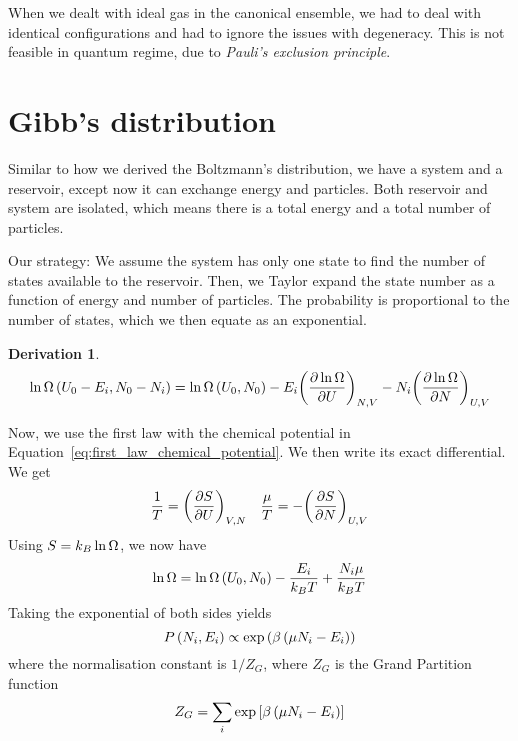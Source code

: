 \documentclass[12pt,chapterprefix=false,dvipsnames]{scrbook}
\theoremstyle{dotless}
\theoremstyle{definition}
\newtheorem{protoderivation}{Derivation}[section]
\newenvironment{derivation}
{\colorlet{shadecolor}{purple!15}\begin{shaded}\begin{protoderivation}}
			{\end{protoderivation}\end{shaded}}
\begin{document}
When we dealt with ideal gas in the canonical ensemble, we had
to deal with identical configurations and had to ignore the
issues with degeneracy. This is not feasible in quantum regime,
due to \textit{Pauli's exclusion principle}.

\section{Gibb's distribution}%
\label{sec:gibb_s_distribution}

Similar to how we derived the Boltzmann's distribution, we have
a system and a reservoir, except now it can exchange energy and
particles. Both reservoir and system are isolated, which means
there is a total energy and a total number of particles.

Our strategy: We assume the system has only one state to find
the number of states available to the reservoir. Then, we Taylor
expand the state number as a function of energy and number of
particles. The probability is proportional to the number of
states, which we then equate as an exponential.

\begin{derivation}
	\begin{equation}
		\naturallogarithm \Omega \left( U_0 - E_i, N_0 - N_i\right)
		=
		\naturallogarithm\Omega\left( U_0, N_0\right) - E_i
		{\left(\pdv{\naturallogarithm\Omega}{U}\right)}_{N,V} - N_i
		{\left(\pdv{\naturallogarithm\Omega}{N}\right)}_{U,V}
	\end{equation}

	Now, we use the first law with the chemical potential in
	Equation~\ref{eq:first_law_chemical_potential}. We then write its exact
	differential. We get
	\begin{equation}
		\frac{1}{T} = {\left(\pdv{S}{U}\right)}_{V,
		N}\hspace{1em} \frac{\mu}{T} =
		-{\left(\pdv{S}{N}\right)}_{U,V}
	\end{equation}
	Using $S = k_B \naturallogarithm\Omega$, we now have
	\begin{equation}
		\naturallogarithm\Omega =
		\naturallogarithm\Omega\left(U_0, N_0\right) -
		\frac{E_i}{k_B T} + \frac{N_i \mu}{k_B T}
	\end{equation}
	Taking the exponential of both sides yields
	\begin{equation}
		P\left(N_i, E_i\right) \propto \exponential\left( \beta
		\left(\mu N_i - E_i \right) \right)
	\end{equation}
	where the normalisation constant is $1/Z_G$,
	where $Z_G$ is the Grand Partition function
	\begin{equation}
		Z_G = \sum_i \exponential\left[ \beta \left( \mu N_i - E_i \right) \right]
	\end{equation}
\end{derivation}
\end{document}
